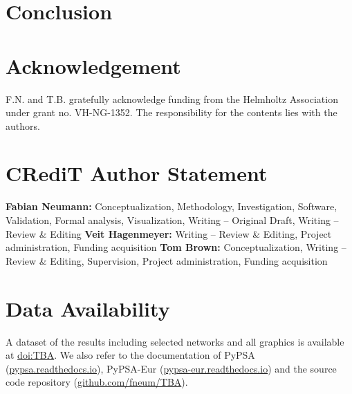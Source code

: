 \documentclass[1p,11pt]{elsarticle}
\begin{document}


\section{Conclusion}
\label{sec:conclusion}



\section*{Acknowledgement}

F.N. and T.B. gratefully acknowledge funding from the Helmholtz
Association under grant no. VH-NG-1352.
The responsibility for the contents lies with the authors.
\doclicenseLongText
\doclicenseIcon

\section*{CRediT Author Statement}

\textbf{Fabian Neumann:} Conceptualization, Methodology, Investigation, Software, Validation, Formal analysis, Visualization, Writing -- Original Draft, Writing -- Review \& Editing
\textbf{Veit Hagenmeyer:} Writing -- Review \& Editing, Project administration, Funding acquisition
\textbf{Tom Brown:} Conceptualization, Writing -- Review \& Editing, Supervision, Project administration, Funding acquisition

\section*{Data Availability}

A dataset of the results including selected networks and all graphics is available at \href{TBA}{doi:TBA}. 
We also refer to the documentation of PyPSA (\href{https://pypsa.readthedocs.io}{pypsa.readthedocs.io}),
PyPSA-Eur (\href{https://pypsa-eur.readthedocs.io}{pypsa-eur.readthedocs.io}) and the source code 
repository
(\href{https://github.com/fneum/TBA}{github.com/fneum/TBA}).



% 	
\end{document}
